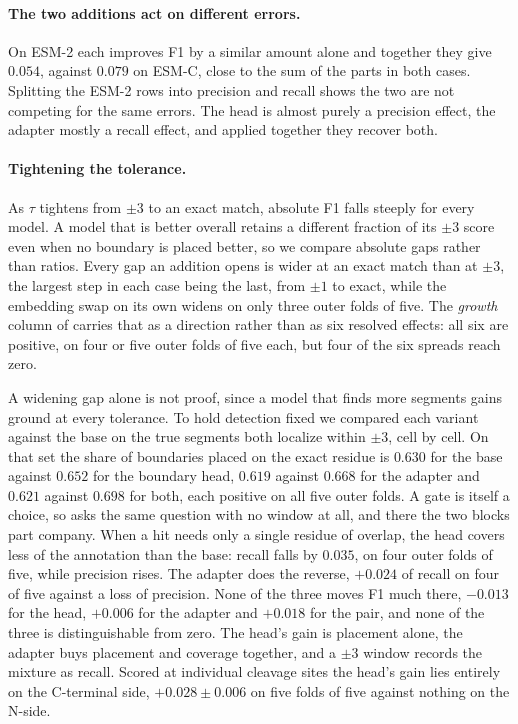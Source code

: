 \documentclass{article}
\begin{document}
\paragraph{The two additions act on different errors.} On ESM-2 each improves F1 by a similar amount alone and together they give $0.054$, against $0.079$ on ESM-C, close to the sum of the parts in both cases. Splitting the ESM-2 rows into precision and recall shows the two are not competing for the same errors. The head is almost purely a precision effect, the adapter mostly a recall effect, and applied together they recover both.

\paragraph{Tightening the tolerance.} As $\tau$ tightens from $\pm3$ to an exact match, absolute F1 falls steeply for every model. A model that is better overall retains a different fraction of its $\pm3$ score even when no boundary is placed better, so we compare absolute gaps rather than ratios. Every gap an addition opens is wider at an exact match than at $\pm3$, the largest step in each case being the last, from $\pm1$ to exact, while the embedding swap on its own widens on only three outer folds of five. The \emph{growth} column of  carries that as a direction rather than as six resolved effects: all six are positive, on four or five outer folds of five each, but four of the six spreads reach zero.

A widening gap alone is not proof, since a model that finds more segments gains ground at every tolerance. To hold detection fixed we compared each variant against the base on the true segments both localize within $\pm3$, cell by cell. On that set the share of boundaries placed on the exact residue is $0.630$ for the base against $0.652$ for the boundary head, $0.619$ against $0.668$ for the adapter and $0.621$ against $0.698$ for both, each positive on all five outer folds. A gate is itself a choice, so  asks the same question with no window at all, and there the two blocks part company. When a hit needs only a single residue of overlap, the head covers less of the annotation than the base: recall falls by $0.035$, on four outer folds of five, while precision rises. The adapter does the reverse, $+0.024$ of recall on four of five against a loss of precision. None of the three moves F1 much there, $-0.013$ for the head, $+0.006$ for the adapter and $+0.018$ for the pair, and none of the three is distinguishable from zero. The head's gain is placement alone, the adapter buys placement and coverage together, and a $\pm3$ window records the mixture as recall. Scored at individual cleavage sites the head's gain lies entirely on the C-terminal side, $+0.028\pm0.006$ on five folds of five against nothing on the N-side.
\end{document}
